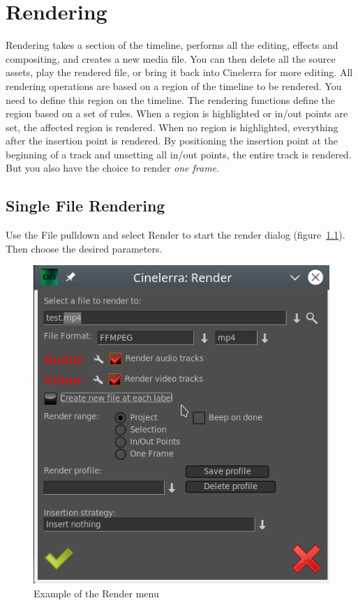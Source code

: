 \chapter{Rendering}%
\label{cha:rendering}

Rendering takes a section of the timeline, performs all the editing, effects and compositing, and creates a new media file.  You can then delete all the source assets, play the rendered file, or bring it back into Cinelerra for more editing.   All rendering operations are based on a region of the timeline to be rendered.  You need to define this region on the timeline.  The rendering functions define the region based on a set of rules.  When a region is highlighted or in/out points are set, the affected region is rendered.  When no region is highlighted, everything after the insertion point is rendered.  By
positioning the insertion point at the beginning of a track and unsetting all in/out points, the entire track is rendered.  But you also have the choice to render \textit{one frame}.

\section{Single File Rendering}%
\label{sec:single_file_rendering}

Use the File pulldown and select Render to start the render dialog (figure~\ref{fig:render}).  Then choose the desired parameters.

\begin{figure}[htpb]
    \centering
    \includegraphics[width=0.7\linewidth]{images/render.png}
    \caption{Example of the Render menu}
    \label{fig:render}
\end{figure}

